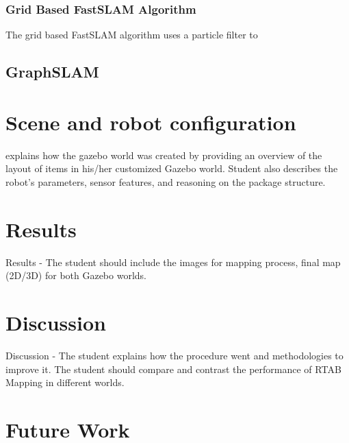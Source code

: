 \documentclass[a4paper]{article}
\begin{document}
\subsubsection{Grid Based FastSLAM Algorithm}
The grid based FastSLAM algorithm uses a particle filter to 

\subsection{GraphSLAM}


\section{Scene and robot configuration}
explains how the gazebo world was created by providing an overview of the layout of items in his/her customized Gazebo world. Student also describes the robot's parameters, sensor features, and reasoning on the package structure.

\section{Results}
Results - The student should include the images for mapping process, final map (2D/3D) for both Gazebo worlds.


\section{Discussion}
Discussion - The student explains how the procedure went and methodologies to improve it. The student should compare and contrast the performance of RTAB Mapping in different worlds.


\section{Future Work}




\end{document}
